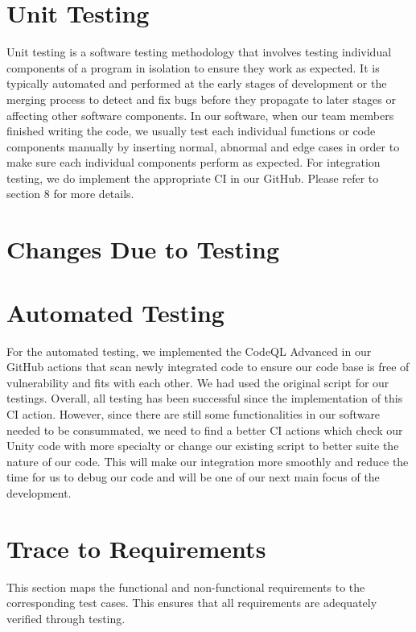 \documentclass[12pt, titlepage]{article}
\begin{document}
\section{Unit Testing}
Unit testing is a software testing methodology that involves testing individual components of a program in isolation to ensure they work as expected. It is typically automated and performed at the early stages of development or the merging process to detect and fix bugs before they propagate to later stages or affecting other software components. In our software, when our team members finished writing the code, we usually test each individual functions or code components manually by inserting normal, abnormal and edge cases in order to make sure each individual components perform as expected. For integration testing, we do implement the appropriate CI in our GitHub. Please refer to section 8 for more details.
\section{Changes Due to Testing}

\section{Automated Testing}
For the automated testing, we implemented the CodeQL Advanced in our GitHub actions that scan newly integrated code to ensure our code base is free of vulnerability and fits with each other. We had used the original script for our testings. Overall, all testing has been successful since the implementation of this CI action. However, since there are still some functionalities in our software needed to be consummated, we need to find a better CI actions which check our Unity code with more specialty or change our existing script to better suite the nature of our code. This will make our integration more smoothly and reduce the time for us to debug our code and will be one of our next main focus of the development.

\section{Trace to Requirements}

This section maps the functional and non-functional requirements to the corresponding test cases. This ensures that all requirements are adequately verified through testing.
\end{document}
